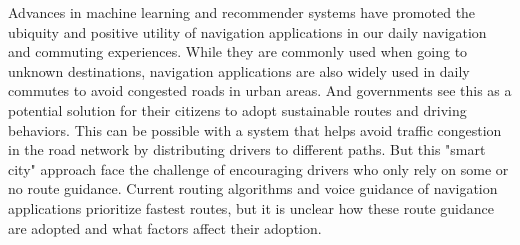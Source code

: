 Advances in machine learning and recommender systems have promoted the ubiquity and positive utility of navigation applications in our daily navigation and commuting experiences. While they are commonly used when going to unknown destinations, navigation applications are also widely used in daily commutes to avoid congested roads in urban areas. And governments see this as a potential solution for their citizens to adopt sustainable routes and driving behaviors. This can be possible with a system that helps avoid traffic congestion in the road network by distributing drivers to different paths. But this "smart city" approach face the challenge of encouraging drivers who only rely on some or no route guidance. Current routing algorithms and voice guidance of navigation applications prioritize fastest routes, but it is unclear how these route guidance are adopted and what factors affect their adoption.

